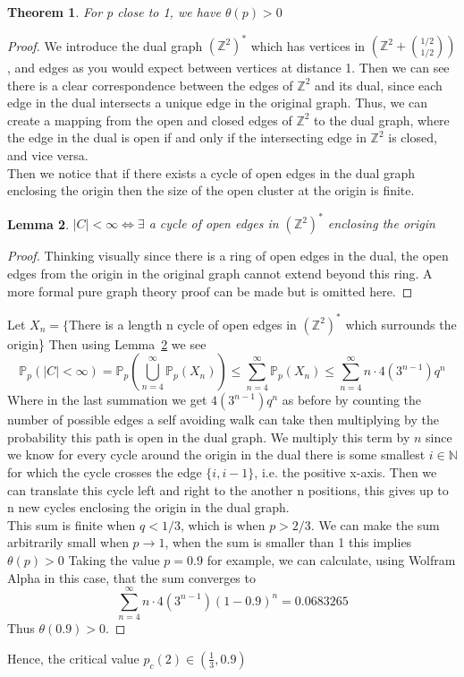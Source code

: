 \documentclass[a4paper,11pt]{article}
\newtheorem{theorem}{Theorem}[section]
\newtheorem{lemma}[theorem]{Lemma}
\theoremstyle{definition}
\newcommand{\ints}{\mathbb{Z}}
\newcommand{\ztwodual}{(\ints^2)^*}
\newcommand{\prob}{\mathbb{P}_p}
\begin{document}
\begin{theorem}
	For p close to 1, we have $\theta(p) > 0$
\end{theorem}
\begin{proof}
	We introduce the dual graph $(\ints^2)^*$ which has vertices in $(\ints^2 + \binom{1/2}{1/2} )$, and edges as you would expect between vertices at distance 1.
	Then we can see there is a clear correspondence between the edges of $\ints^2$ and its dual, since each edge in the dual intersects a unique edge in the original graph. 
	Thus, we can create a mapping from the open and closed edges of $\ints^2$ to the dual graph, where the edge in the dual is open if and only if the intersecting edge in $\ints^2$ is closed, and vice versa.\\
	Then we notice that if there exists a cycle of open edges in the dual graph enclosing the origin then the size of the open cluster at the origin is finite. 
	\begin{lemma}\label{originloop}
		$|C| < \infty \iff \exists$ a cycle of open edges in $(\ints^2)^*$  enclosing the origin
	\end{lemma}
	\begin{proof}
		{Thinking visually since there is a ring of open edges in the dual, the open edges from the origin in the original graph cannot extend beyond this ring. A more formal pure graph theory proof can be made but is omitted here.}
	\end{proof}
	Let $X_n = \{$There is a length n cycle of open edges in $\ztwodual$ which surrounds the origin\}
	Then using Lemma~\ref{originloop} we see
	$$\prob(|C| < \infty) = \prob(\bigcup_{n=4}^\infty \prob(X_n)) \leq \sum_{n=4}^\infty \prob(X_n) \leq \sum_{n=4}^\infty n \cdot 4(3^{n-1})q^n$$
	Where in the last summation we get $4(3^{n-1})q^n$ as before by counting the number of possible edges a self avoiding walk can take then multiplying by the probability this path is open in the dual graph. 
	We multiply this term by $n$ since we know for every cycle around the origin in the dual there is some smallest $i \in \mathbb{N}$ for which the cycle crosses the edge $\{i,i-1\}$, i.e. the positive x-axis. 
	Then we can translate this cycle left and right to the another n positions, this gives up to n new cycles enclosing the origin in the dual graph.\\
	This sum is finite when $q<1/3$, which is when $p>2/3$. 
	We can make the sum arbitrarily small when $p \rightarrow 1$, when the sum is smaller than 1 this implies $\theta(p) > 0$
	Taking the value $p=0.9$ for example, we can calculate, using Wolfram Alpha in this case, that the sum converges to 
	$$\sum_{n=4}^\infty n \cdot 4(3^{n-1})(1-0.9)^n = 0.0683265$$
	Thus $\theta(0.9) > 0$.

\end{proof}
Hence, the critical value $p_c(2) \in (\frac{1}{3},0.9)$
\end{document}
